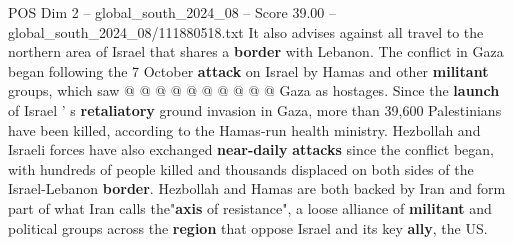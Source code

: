 \begin{textsample}{POS Dim 2 – global\_south\_2024\_08 – Score 39.00 – global\_south\_2024\_08/111880518.txt}
It also advises against all travel to the northern area of Israel that shares a \textbf{border} with Lebanon.
The conflict in Gaza began following the 7 October \textbf{attack} on Israel by Hamas and other \textbf{militant} groups, which saw @ @ @ @ @ @ @ @ @ @ Gaza as hostages.
Since the \textbf{launch} of Israel ' s \textbf{retaliatory} ground invasion in Gaza, more than 39,600 Palestinians have been killed, according to the Hamas-run health ministry.
Hezbollah and Israeli forces have also exchanged \textbf{near-daily} \textbf{attacks} since the conflict began, with hundreds of people killed and thousands displaced on both sides of the Israel-Lebanon \textbf{border}.
Hezbollah and Hamas are both backed by Iran and form part of what Iran calls the"\textbf{axis} of resistance", a loose alliance of \textbf{militant} and political groups across the \textbf{region} that oppose Israel and its key \textbf{ally}, the US.

\end{textsample}
